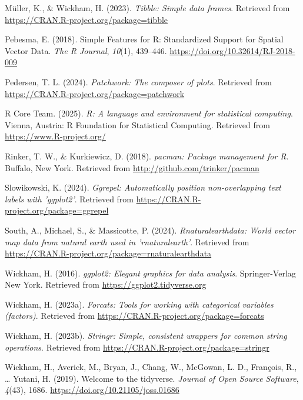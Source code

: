 \documentclass[
  man,floatsintext]{apa6}
\newlength{\cslhangindent}
\newenvironment{CSLReferences}[2] %
 {\begin{list}{}{%
  \setlength{\itemindent}{0pt}
  \setlength{\leftmargin}{0pt}
  \setlength{\parsep}{0pt}
  \ifodd #1
   \setlength{\leftmargin}{\cslhangindent}
   \setlength{\itemindent}{-1\cslhangindent}
  \fi
  \setlength{\itemsep}{#2\baselineskip}}}
 {\end{list}}
\begin{document}
\begin{CSLReferences}{1}{0}
Müller, K., \& Wickham, H. (2023). \emph{Tibble: Simple data frames}. Retrieved from \url{https://CRAN.R-project.org/package=tibble}

Pebesma, E. (2018). {Simple Features for R: Standardized Support for Spatial Vector Data}. \emph{{The R Journal}}, \emph{10}(1), 439--446. \url{https://doi.org/10.32614/RJ-2018-009}

Pedersen, T. L. (2024). \emph{Patchwork: The composer of plots}. Retrieved from \url{https://CRAN.R-project.org/package=patchwork}

R Core Team. (2025). \emph{R: A language and environment for statistical computing}. Vienna, Austria: R Foundation for Statistical Computing. Retrieved from \url{https://www.R-project.org/}

Rinker, T. W., \& Kurkiewicz, D. (2018). \emph{{pacman}: {P}ackage management for {R}}. Buffalo, New York. Retrieved from \url{http://github.com/trinker/pacman}

Slowikowski, K. (2024). \emph{Ggrepel: Automatically position non-overlapping text labels with 'ggplot2'}. Retrieved from \url{https://CRAN.R-project.org/package=ggrepel}

South, A., Michael, S., \& Massicotte, P. (2024). \emph{Rnaturalearthdata: World vector map data from natural earth used in 'rnaturalearth'}. Retrieved from \url{https://CRAN.R-project.org/package=rnaturalearthdata}

Wickham, H. (2016). \emph{ggplot2: Elegant graphics for data analysis}. Springer-Verlag New York. Retrieved from \url{https://ggplot2.tidyverse.org}

Wickham, H. (2023a). \emph{Forcats: Tools for working with categorical variables (factors)}. Retrieved from \url{https://CRAN.R-project.org/package=forcats}

Wickham, H. (2023b). \emph{Stringr: Simple, consistent wrappers for common string operations}. Retrieved from \url{https://CRAN.R-project.org/package=stringr}

Wickham, H., Averick, M., Bryan, J., Chang, W., McGowan, L. D., François, R., \ldots{} Yutani, H. (2019). Welcome to the {tidyverse}. \emph{Journal of Open Source Software}, \emph{4}(43), 1686. \url{https://doi.org/10.21105/joss.01686}


\end{CSLReferences}
\end{document}
